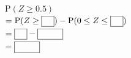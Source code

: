 \noindent\begin{minipage}[t]{0.58\linewidth}\vspace{0pt}\raggedright $\mathrm{P}(Z\ge 0.5)$\\ $=\mathrm{P}(Z\ge\blank)-\mathrm{P}(0\le Z\le\blank)$\\ $=\blank-\blank[3em]$\\ $=\blank[3em]$\end{minipage}\hfill\begin{minipage}[t]{0.4\linewidth}\vspace{0pt}\centering \resizebox{\ifdim\width>\linewidth\linewidth\else\width\fi}{!}{}\end{minipage}\par
